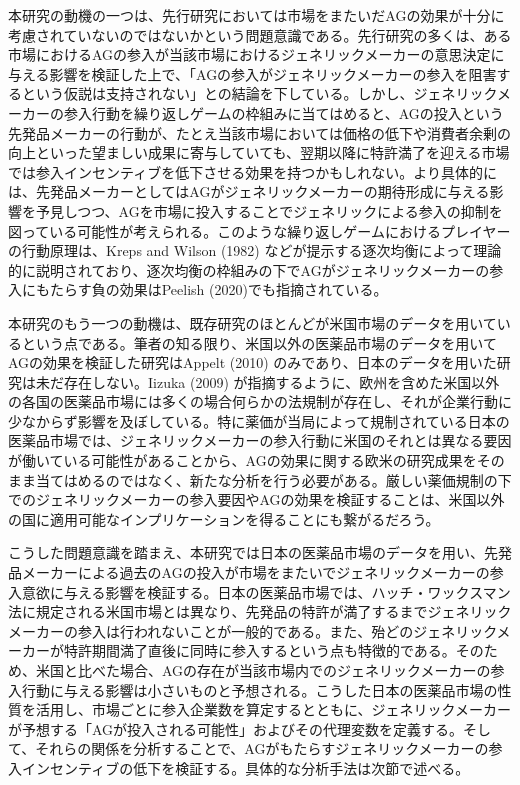 \documentclass[a4j,10.5pt]{jarticle}
\begin{document}
本研究の動機の一つは、先行研究においては市場をまたいだAGの効果が十分に考慮されていないのではないかという問題意識である。先行研究の多くは、ある市場におけるAGの参入が当該市場におけるジェネリックメーカーの意思決定に与える影響を検証した上で、「AGの参入がジェネリックメーカーの参入を阻害するという仮説は支持されない」との結論を下している。しかし、ジェネリックメーカーの参入行動を繰り返しゲームの枠組みに当てはめると、AGの投入という先発品メーカーの行動が、たとえ当該市場においては価格の低下や消費者余剰の向上といった望ましい成果に寄与していても、翌期以降に特許満了を迎える市場では参入インセンティブを低下させる効果を持つかもしれない。より具体的には、先発品メーカーとしてはAGがジェネリックメーカーの期待形成に与える影響を予見しつつ、AGを市場に投入することでジェネリックによる参入の抑制を図っている可能性が考えられる。このような繰り返しゲームにおけるプレイヤーの行動原理は、Kreps and Wilson (1982) などが提示する逐次均衡によって理論的に説明されており、逐次均衡の枠組みの下でAGがジェネリックメーカーの参入にもたらす負の効果はPeelish (2020)でも指摘されている。\par
本研究のもう一つの動機は、既存研究のほとんどが米国市場のデータを用いているという点である。筆者の知る限り、米国以外の医薬品市場のデータを用いてAGの効果を検証した研究はAppelt (2010) のみであり、日本のデータを用いた研究は未だ存在しない。Iizuka (2009) が指摘するように、欧州を含めた米国以外の各国の医薬品市場には多くの場合何らかの法規制が存在し、それが企業行動に少なからず影響を及ぼしている。特に薬価が当局によって規制されている日本の医薬品市場では、ジェネリックメーカーの参入行動に米国のそれとは異なる要因が働いている可能性があることから、AGの効果に関する欧米の研究成果をそのまま当てはめるのではなく、新たな分析を行う必要がある。厳しい薬価規制の下でのジェネリックメーカーの参入要因やAGの効果を検証することは、米国以外の国に適用可能なインプリケーションを得ることにも繋がるだろう。\par
こうした問題意識を踏まえ、本研究では日本の医薬品市場のデータを用い、先発品メーカーによる過去のAGの投入が市場をまたいでジェネリックメーカーの参入意欲に与える影響を検証する。日本の医薬品市場では、ハッチ・ワックスマン法に規定される米国市場とは異なり、先発品の特許が満了するまでジェネリックメーカーの参入は行われないことが一般的である。また、殆どのジェネリックメーカーが特許期間満了直後に同時に参入するという点も特徴的である。そのため、米国と比べた場合、AGの存在が当該市場内でのジェネリックメーカーの参入行動に与える影響は小さいものと予想される。こうした日本の医薬品市場の性質を活用し、市場ごとに参入企業数を算定するとともに、ジェネリックメーカーが予想する「AGが投入される可能性」およびその代理変数を定義する。そして、それらの関係を分析することで、AGがもたらすジェネリックメーカーの参入インセンティブの低下を検証する。具体的な分析手法は次節で述べる。
\end{document}
